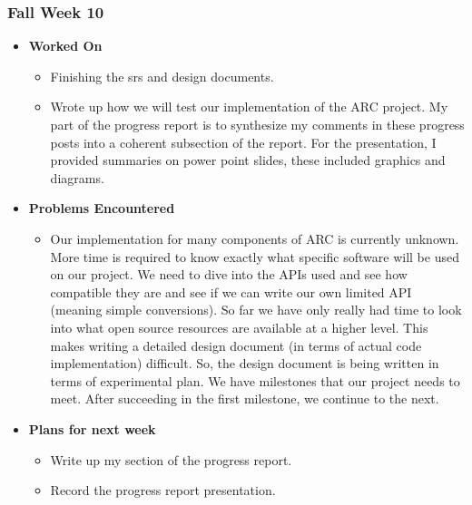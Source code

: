 \documentclass[compsoc,draftclsnofoot,onecolumn,10pt]{IEEEtran}
\begin{document}
\subsubsection{Fall Week 10}
\begin{itemize}
    \item {\textbf{Worked On}}
    \begin{itemize}
        \item Finishing the srs and design documents.
        \item Wrote up how we will test our implementation of the ARC project.
        My part of the progress report is to synthesize my comments in these progress posts into a coherent subsection of the report.
        For the presentation, I provided summaries on power point slides, these included graphics and diagrams.
    \end{itemize}

    \item {\textbf{Problems Encountered}}
    \begin{itemize}
        \item Our implementation for many components of ARC is currently unknown. More time is required to know exactly what specific software will be used on our project. We need to dive into the APIs used and see how compatible they are and see if we can write our own limited API (meaning simple conversions). So far we have only really had time to look into what open source resources are available at a higher level. This makes writing a detailed design document (in terms of actual code implementation) difficult. So, the design document is being written in terms of experimental plan. We have milestones that our project needs to meet. After succeeding in the first milestone, we continue to the next.
    \end{itemize}

    \item{\textbf{Plans for next week}}
    \begin{itemize}
        \item Write up my section of the progress report.
        \item Record the progress report presentation.


    \end{itemize}
\end{itemize}
\end{document}
